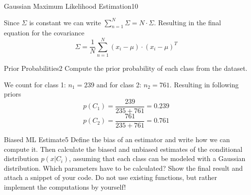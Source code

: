\begin{questions}
\begin{question}{Gaussian Maximum Likelihood Estimation}{10}
\begin{answer}
Since $\Sigma$ is constant we can write $\sum_{n=1}^{N}\Sigma = N\cdot\Sigma$.
Resulting in the final equation for the covariance
\begin{equation}
	\Sigma = \frac{1}{N} \sum_{n=1}^{N}(x_i -\mu)\cdot(x_i - \mu)^T
\end{equation}

\end{answer}

\end{question}


\begin{question}{Prior Probabilities}{2}
Compute the prior probability of each class from the dataset. 

\begin{answer}
We count for class 1: $n_1 = 239$ and for class 2: $n_2 = 761$. Resulting in following priors
\begin{equation}
	p(C_1) = \frac{239}{235+761} = 0.239
\end{equation}
\begin{equation}
    p(C_2) = \frac{761}{235+761} = 0.761
\end{equation}

\end{answer}

\end{question}



\begin{question}{Biased ML Estimate}{5}
Define the bias of an estimator and write how we can compute it.
Then calculate the biased and unbiased estimates of the conditional distribution $p(x|C_i)$, assuming that each class can be modeled with a Gaussian distribution. Which parameters have to be calculated?
Show the final result and attach a snippet of your code.
Do not use existing functions, but rather implement the computations by yourself!


\end{question}
\end{questions}

